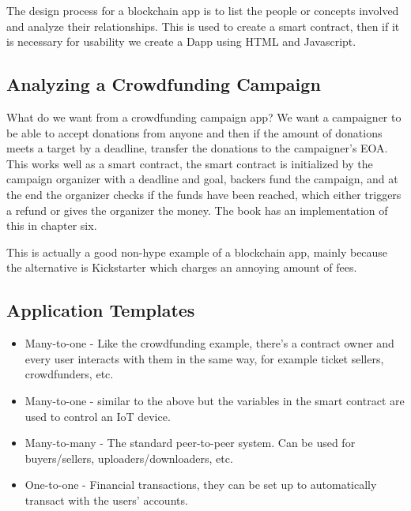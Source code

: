 \documentclass{article}
\begin{document}
The design process for a blockchain app is to list the people or concepts involved and analyze their relationships. This is used to create a smart contract,
then if it is necessary for usability we create a Dapp using HTML and Javascript.

\subsection{Analyzing a Crowdfunding Campaign}
What do we want from a crowdfunding campaign app? We want a campaigner to be able to accept donations from anyone and then if the amount of donations meets a target by a deadline, transfer the donations to the campaigner's EOA. This works well as a smart contract, the smart contract is initialized by the campaign organizer with a deadline and goal, backers fund the campaign, and at the end the organizer checks if the funds have been reached, which either triggers a refund or gives the organizer the money. The book has an implementation of this in chapter six.

This is actually a good non-hype example of a blockchain app, mainly because the alternative is Kickstarter which charges an annoying amount of fees.

\subsection{Application Templates}
\begin{itemize}
\item Many-to-one - Like the crowdfunding example, there's a contract owner and every user interacts with them in the same way, for example ticket sellers, crowdfunders, etc.
\item Many-to-one - similar to the above but the variables in the smart contract are used to control an IoT device.
\item Many-to-many - The standard peer-to-peer system. Can be used for buyers/sellers, uploaders/downloaders, etc.
\item One-to-one - Financial transactions, they can be set up to automatically transact with the users' accounts.
\end{itemize}
\end{document}
